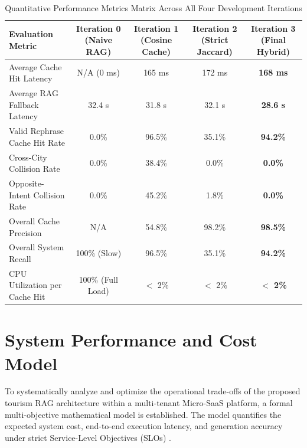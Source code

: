 \documentclass{ieeeaccess}
\begin{document}
\begin{table}[t]
\centering
\caption{Quantitative Performance Metrics Matrix Across All Four Development Iterations}
\begin{tabular}{lcccc}
\toprule
\textbf{Evaluation Metric} & \textbf{Iteration 0 (Naive RAG)} & \textbf{Iteration 1 (Cosine Cache)} & \textbf{Iteration 2 (Strict Jaccard)} & \textbf{Iteration 3 (Final Hybrid)} \\
\midrule
Average Cache Hit Latency & N/A (0 ms) & 165 ms & 172 ms & \textbf{168 ms} \\
Average RAG Fallback Latency & 32.4 s & 31.8 s & 32.1 s & \textbf{28.6 s} \\
Valid Rephrase Cache Hit Rate & 0.0\% & 96.5\% & 35.1\% & \textbf{94.2\%} \\
Cross-City Collision Rate & 0.0\% & 38.4\% & 0.0\% & \textbf{0.0\%} \\
Opposite-Intent Collision Rate & 0.0\% & 45.2\% & 1.8\% & \textbf{0.0\%} \\
Overall Cache Precision & N/A & 54.8\% & 98.2\% & \textbf{98.5\%} \\
Overall System Recall & 100\% (Slow) & 96.5\% & 35.1\% & \textbf{94.2\%} \\
CPU Utilization per Cache Hit & 100\% (Full Load) & $<$ 2\% & $<$ 2\% & \textbf{$<$ 2\%} \\
\bottomrule
\end{tabular}
\label{tab:methodology_evolution}
\end{table}

\section{System Performance and Cost Model}
To systematically analyze and optimize the operational trade-offs of the proposed tourism RAG architecture within a multi-tenant Micro-SaaS platform, a formal multi-objective mathematical model is established. The model quantifies the expected system cost, end-to-end execution latency, and generation accuracy under strict Service-Level Objectives (SLOs) \cite{devalla-microservice-rag-2025, behera-optimizing-irjmets-2025}.
\end{document}
